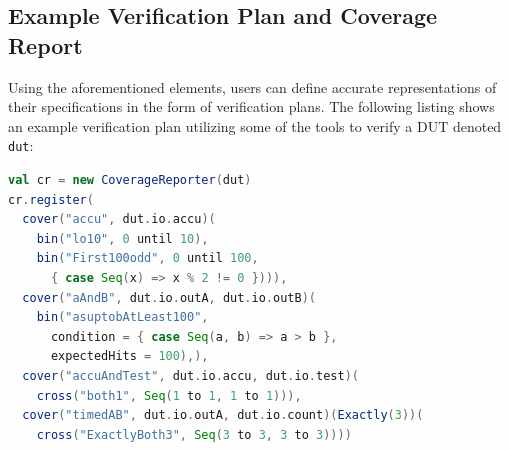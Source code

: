 \documentclass[conference]{IEEEtran}
\begin{document}
\subsection{Example Verification Plan and Coverage Report}%
Using the aforementioned elements, users can define accurate representations of their specifications in the form of verification plans. The following listing shows an example verification plan utilizing some of the tools to verify a DUT denoted \texttt{dut}: 
\begin{lstlisting}[language=scala]
val cr = new CoverageReporter(dut)
cr.register(
  cover("accu", dut.io.accu)(
    bin("lo10", 0 until 10),
    bin("First100odd", 0 until 100,
      { case Seq(x) => x % 2 != 0 }))),
  cover("aAndB", dut.io.outA, dut.io.outB)(
    bin("asuptobAtLeast100", 
      condition = { case Seq(a, b) => a > b }, 
      expectedHits = 100),),
  cover("accuAndTest", dut.io.accu, dut.io.test)(
    cross("both1", Seq(1 to 1, 1 to 1))),
  cover("timedAB", dut.io.outA, dut.io.count)(Exactly(3))(
    cross("ExactlyBoth3", Seq(3 to 3, 3 to 3))))
\end{lstlisting}
\end{document}
